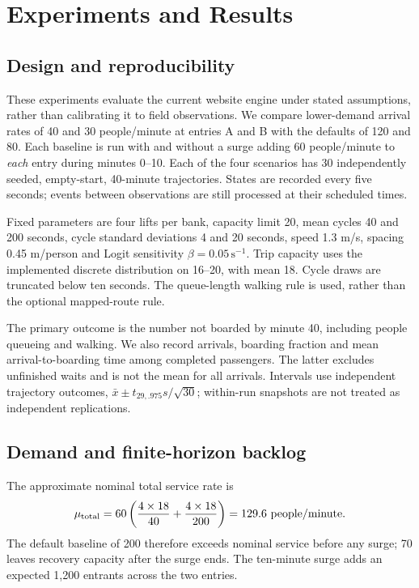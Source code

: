 \section{Experiments and Results}
\label{sec:experiments}
\subsection{Design and reproducibility}
These experiments evaluate the current website engine under stated assumptions, rather than calibrating it to field observations. We compare lower-demand arrival rates of 40 and 30 people/minute at entries A and B with the defaults of 120 and 80. Each baseline is run with and without a surge adding 60 people/minute to \emph{each} entry during minutes 0--10. Each of the four scenarios has 30 independently seeded, empty-start, 40-minute trajectories. States are recorded every five seconds; events between observations are still processed at their scheduled times.

Fixed parameters are four lifts per bank, capacity limit 20, mean cycles 40 and 200 seconds, cycle standard deviations 4 and 20 seconds, speed 1.3 m/s, spacing 0.45 m/person and Logit sensitivity $\beta=0.05\,\mathrm{s}^{-1}$. Trip capacity uses the implemented discrete distribution on 16--20, with mean 18. Cycle draws are truncated below ten seconds. The queue-length walking rule is used, rather than the optional mapped-route rule.

The primary outcome is the number not boarded by minute 40, including people queueing and walking. We also record arrivals, boarding fraction and mean arrival-to-boarding time among completed passengers. The latter excludes unfinished waits and is not the mean for all arrivals. Intervals use independent trajectory outcomes, $\bar{x}\pm t_{29,.975}s/\sqrt{30}$; within-run snapshots are not treated as independent replications.

\subsection{Demand and finite-horizon backlog}
The approximate nominal total service rate is
\[
\mu_{\rm total}=60\left(\frac{4\times18}{40}+\frac{4\times18}{200}\right)
=129.6\ \text{people/minute}.
\]
The default baseline of 200 therefore exceeds nominal service before any surge; 70 leaves recovery capacity after the surge ends. The ten-minute surge adds an expected 1,200 entrants across the two entries.

